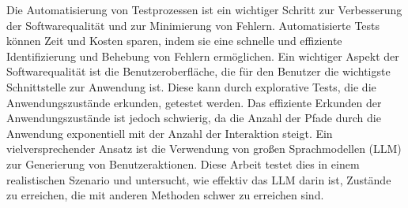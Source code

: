 
\Abstract

Die Automatisierung von Testprozessen ist ein wichtiger Schritt zur Verbesserung der Softwarequalität und zur Minimierung von Fehlern.
Automatisierte Tests können Zeit und Kosten sparen, indem sie eine schnelle und effiziente Identifizierung und Behebung von Fehlern ermöglichen.
Ein wichtiger Aspekt der Softwarequalität ist die Benutzeroberfläche, die für den Benutzer die wichtigste Schnittstelle zur Anwendung ist.
Diese kann durch explorative Tests, die die Anwendungszustände erkunden, getestet werden.
Das effiziente Erkunden der Anwendungszustände ist jedoch schwierig, da die Anzahl der Pfade durch die Anwendung exponentiell mit der Anzahl der Interaktion steigt.
Ein vielversprechender Ansatz ist die Verwendung von großen Sprachmodellen (LLM) zur Generierung von Benutzeraktionen.
Diese Arbeit testet dies in einem realistischen Szenario und untersucht, wie effektiv das LLM darin ist, Zustände zu erreichen, die mit anderen Methoden schwer zu erreichen sind.